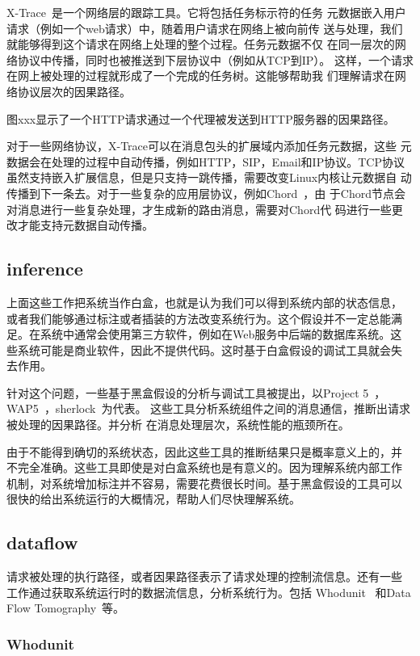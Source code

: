 X-Trace~\cite{x-trace}是一个网络层的跟踪工具。它将包括任务标示符的任务
元数据嵌入用户请求（例如一个web请求）中，随着用户请求在网络上被向前传
送与处理，我们就能够得到这个请求在网络上处理的整个过程。任务元数据不仅
在同一层次的网络协议中传播，同时也被推送到下层协议中（例如从TCP到IP）。
这样，一个请求在网上被处理的过程就形成了一个完成的任务树。这能够帮助我
们理解请求在网络协议层次的因果路径。

图xxx显示了一个HTTP请求通过一个代理被发送到HTTP服务器的因果路径。

对于一些网络协议，X-Trace可以在消息包头的扩展域内添加任务元数据，这些
元数据会在处理的过程中自动传播，例如HTTP，SIP，Email和IP协议。TCP协议
虽然支持嵌入扩展信息，但是只支持一跳传播，需要改变Linux内核让元数据自
动传播到下一条去。对于一些复杂的应用层协议，例如Chord~\cite{chord}，由
于Chord节点会对消息进行一些复杂处理，才生成新的路由消息，需要对Chord代
码进行一些更改才能支持元数据自动传播。

\subsection{inference}

上面这些工作把系统当作白盒，也就是认为我们可以得到系统内部的状态信息，
或者我们能够通过标注或者插装的方法改变系统行为。这个假设并不一定总能满
足。在系统中通常会使用第三方软件，例如在Web服务中后端的数据库系统。这
些系统可能是商业软件，因此不提供代码。这时基于白盒假设的调试工具就会失
去作用。

针对这个问题，一些基于黑盒假设的分析与调试工具被提出，以Project
5~\cite{project5}，WAP5~\cite{wap5}，sherlock~\cite{sherlock}为代表。
这些工具分析系统组件之间的消息通信，推断出请求被处理的因果路径。并分析
在消息处理层次，系统性能的瓶颈所在。

由于不能得到确切的系统状态，因此这些工具的推断结果只是概率意义上的，并
不完全准确。这些工具即使是对白盒系统也是有意义的。因为理解系统内部工作
机制，对系统增加标注并不容易，需要花费很长时间。基于黑盒假设的工具可以
很快的给出系统运行的大概情况，帮助人们尽快理解系统。

\subsection{dataflow}

请求被处理的执行路径，或者因果路径表示了请求处理的控制流信息。还有一些
工作通过获取系统运行时的数据流信息，分析系统行为。包括
Whodunit~\cite{whodunit} 和Data Flow Tomography~\cite{dft}等。

\subsubsection*{Whodunit}

